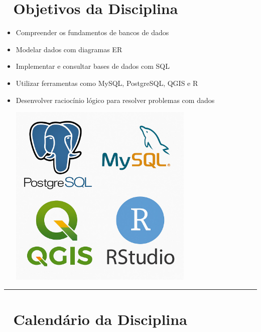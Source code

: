 \documentclass[
]{book}
\begin{document}
\section{🎯 Objetivos da Disciplina}\label{objetivos-da-disciplina}

\begin{itemize}
\item
  Compreender os fundamentos de bancos de dados
\item
  Modelar dados com diagramas ER
\item
  Implementar e consultar bases de dados com SQL
\item
  Utilizar ferramentas como MySQL, PostgreSQL, QGIS e R
\item
  Desenvolver raciocínio lógico para resolver problemas com dados

  \includegraphics[width=3.47917in,height=\textheight]{images/2025-08-04/logos.jpg}
\end{itemize}

\begin{center}\rule{0.5\linewidth}{0.5pt}\end{center}

\section{📅 Calendário da Disciplina}\label{calenduxe1rio-da-disciplina}
\end{document}
